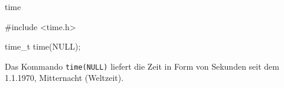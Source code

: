 \begin{man}{time}
    \begin{synopsis}
        \begin{plaincode}[gobble=8]
            #include <time.h>

            time_t time(NULL);
        \end{plaincode}
    \end{synopsis}

    \begin{desc}
        Das Kommando \texttt{time(NULL)} liefert die Zeit in Form von Sekunden seit dem 1.1.1970, Mitternacht (Weltzeit).
    \end{desc}



\end{man}


